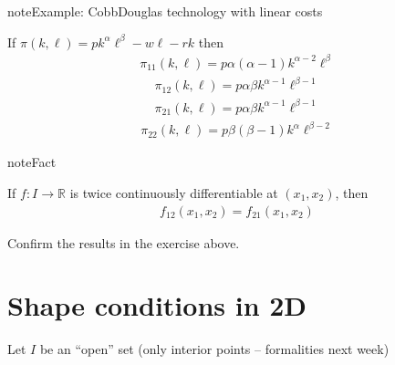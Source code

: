 \documentclass[letterpaper,10pt,english]{jupyterBook}
\begin{document}
\begin{sphinxadmonition}{note}{Example: Cobb\sphinxhyphen{}Douglas technology with linear costs}

\sphinxAtStartPar
If \(\pi(k, \ell) = p k^{\alpha} \ell^{\beta} - w \ell - r k\) then
\begin{equation*}
\begin{split}
\pi_{11}(k, \ell) = p \alpha(\alpha-1) k^{\alpha-2} \ell^{\beta}
\end{split}
\end{equation*}\begin{equation*}
\begin{split}
\pi_{12}(k, \ell) = p \alpha\beta k^{\alpha-1} \ell^{\beta-1}
\end{split}
\end{equation*}\begin{equation*}
\begin{split}
\pi_{21}(k, \ell) = p \alpha\beta k^{\alpha-1} \ell^{\beta-1}
\end{split}
\end{equation*}\begin{equation*}
\begin{split}
\pi_{22}(k, \ell) = p \beta(\beta-1) k^{\alpha} \ell^{\beta-2}
\end{split}
\end{equation*}\end{sphinxadmonition}

\begin{sphinxadmonition}{note}{Fact}

\sphinxAtStartPar
If \(f \colon I \to \mathbb{R}\) is twice continuously differentiable at \((x_1, x_2)\), then
\begin{equation*}
\begin{split}
f_{12}(x_1, x_2) = f_{21}(x_1, x_2)
\end{split}
\end{equation*}\end{sphinxadmonition}

\sphinxAtStartPar
{} Confirm the results in the exercise above.


\section{Shape conditions in 2D}
\label{\detokenize{02.optimization_intro:shape-conditions-in-2d}}
\sphinxAtStartPar
Let \(I\) be an “open” set (only interior points – formalities next week)
\end{document}
